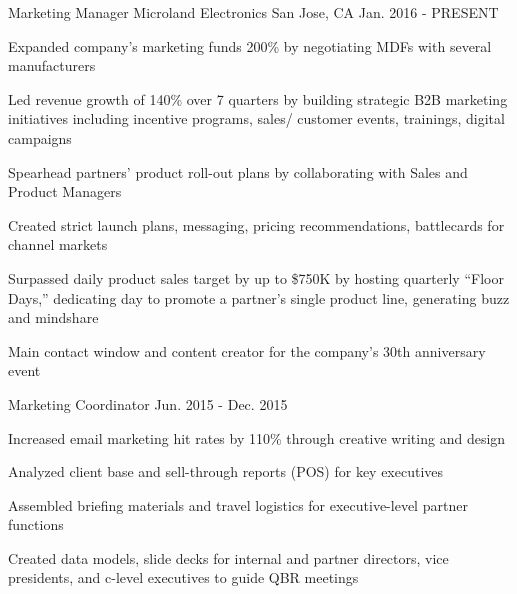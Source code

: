 

\begin{cventries}

  \cventry
    {Marketing Manager} %
    {Microland Electronics} %
    {San Jose, CA} %
    {Jan. 2016 - PRESENT} %
    {
      \begin{cvitems} %
               \item {Expanded company’s marketing funds 200\% by negotiating MDFs with several manufacturers}
       \item {Led revenue growth of 140\% over 7 quarters by building strategic B2B marketing initiatives \newline including incentive programs, sales/ customer events, trainings, digital campaigns}
        \item {Spearhead partners’ product roll-out plans by collaborating with Sales and Product Managers}
        \item {Created strict launch plans, messaging, pricing recommendations, battlecards for channel markets}
        \item {Surpassed daily product sales target by up to \$750K by hosting quarterly “Floor Days,” dedicating  day to promote a partner’s single product line, generating buzz and mindshare}
        \item {Main contact window and content creator for the company’s 30th anniversary event}
      \end{cvitems}
    }

  \cventry
    {Marketing Coordinator} %
    {} %
    {} %
    {Jun. 2015 - Dec. 2015} %
    {
      \begin{cvitems} %
        \item {Increased email marketing hit rates by 110\% through creative writing and design}
        \item {Analyzed client base and sell-through reports (POS) for key executives}
        \item {Assembled briefing materials and travel logistics for executive-level partner functions}
                \item {Created data models, slide decks for internal and partner directors, vice presidents, and \newline c-level executives to guide QBR meetings}
      \end{cvitems}
    }

  
\end{cventries}
